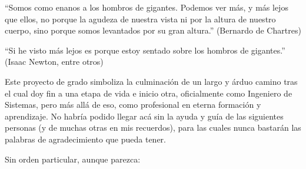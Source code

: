 \begin{displayquote}``Somos como enanos a los hombros de gigantes. Podemos ver más, y más lejos que ellos, no porque la agudeza de nuestra vista ni por la altura de nuestro cuerpo, sino porque somos levantados por su gran altura.'' (Bernardo de Chartres)
\end{displayquote}

\begin{displayquote}
``Si he visto más lejos es porque estoy sentado sobre los hombros de gigantes.'' (Isaac Newton, entre otros)
\end{displayquote}

Este proyecto de grado simboliza la culminación de un largo y árduo camino tras el cual doy fin a una etapa de vida e inicio otra, oficialmente como Ingeniero de Sistemas, pero más allá de eso, como profesional en eterna formación y aprendizaje. No habría podido llegar acá sin la ayuda y guía de las siguientes personas (y de muchas otras en mis recuerdos), para las cuales nunca bastarán las palabras de agradecimiento que pueda tener.

\vspace{4mm}

Sin orden particular, aunque parezca:

\vspace{4mm}

